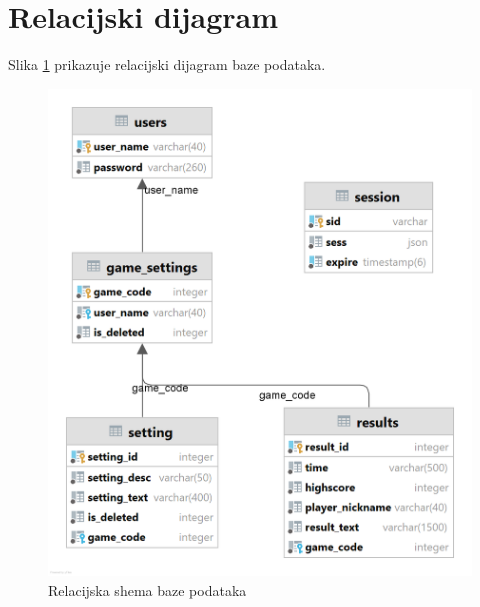 \documentclass[times, utf8, zavrsni, numeric]{fer}
\begin{document}
	\section{Relacijski dijagram}
		Slika \ref{fig:relshema} prikazuje relacijski dijagram baze podataka.
		\begin{figure}[H]
			\includegraphics[width=\linewidth]{"slike/REL.png"} 
			\centering
			\caption{Relacijska shema baze podataka}
			\label{fig:relshema}
		\end{figure}
	
\end{document}
